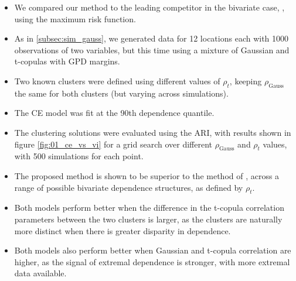 \documentclass{article}
\numberwithin{equation}{section}
\begin{document}
\begin{itemize}
  \item We compared our method to the leading competitor in the bivariate case, \cite{Vignotto2021}, using the maximum risk function.
  \item As in \ref{subsec:sim_gauss}, we generated data for 12 locations each with 1000 observations of two variables, but this time using a mixture of Gaussian and t-copulas with GPD margins. 
  \item Two known clusters were defined using different values of $\rho_t$, keeping $\rho_{\text{Gauss}}$ the same for both clusters (but varying across simulations).
  \item The CE model was fit at the 90th dependence quantile. 
  \item The clustering solutions were evaluated using the ARI, with results shown in figure \ref{fig:01_ce_vs_vi} for a grid search over different $\rho_{\text{Gauss}}$ and $\rho_{t}$ values, with 500 simulations for each point.
  \item The proposed method is shown to be superior to the method of \cite{Vignotto2021}, across a range of possible bivariate dependence structures, as defined by $\rho_t$.
  \item Both models perform better when the difference in the t-copula correlation parameters between the two clusters is larger, as the clusters are naturally more distinct when there is greater disparity in dependence.
  \item Both models also perform better when Gaussian and t-copula correlation are higher, as the signal of extremal dependence is stronger, with more extremal data available.
\end{itemize}
\end{document}
